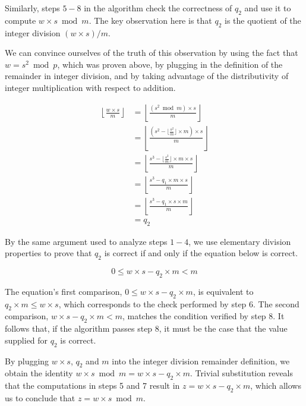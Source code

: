 
Similarly, steps $5 - 8$ in the algorithm check the correctness of $q_2$ and
use it to compute $w \times s \bmod m$. The key observation here is that
$q_2$ is the quotient of the integer division $(w \times s) / m$.

We can convince ourselves of the truth of this observation by using the fact
that $w = s^2 \bmod p$, which was proven above, by plugging in the definition
of the remainder in integer division, and by taking advantage of the
distributivity of integer multiplication with respect to addition.

\begin{align*}
\left\lfloor \frac{w \times s}{m} \right\rfloor
    & = \left\lfloor \frac{(s^2 \bmod m) \times s}{m} \right\rfloor \\
    & = \left\lfloor \frac{(s^2 - \lfloor \frac{s^2}{m} \rfloor \times m)
        \times s}{m} \right\rfloor \\
    & = \left\lfloor \frac{s^3 - \lfloor \frac{s^2}{m} \rfloor \times m
        \times s}{m} \right\rfloor \\
    & = \left\lfloor \frac{s^3 - q_1 \times m \times s}{m} \right\rfloor \\
    & = \left\lfloor \frac{s^3 - q_1 \times s \times m}{m} \right\rfloor \\
    & = q_2
\end{align*}

By the same argument used to analyze steps $1 - 4$, we use elementary division
properties to prove that $q_2$ is correct if and only if the equation below is
correct.

$$ 0 \le w \times s - q_2 \times m < m $$

The equation's first comparison, $0 \le w \times s - q_2 \times m$, is
equivalent to $q_2 \times m \le w \times s$, which corresponds to the check
performed by step 6. The second comparison, $w \times s - q_2 \times m < m$,
matches the condition verified by step 8. It follows that, if the algorithm
passes step 8, it must be the case that the value supplied for $q_2$ is
correct.

By plugging $w \times s$, $q_2$ and $m$ into the integer division remainder
definition, we obtain the identity
$w \times s \bmod m = w \times s - q_2 \times m$. Trivial substitution reveals
that the computations in steps 5 and 7 result in
$z = w \times s - q_2 \times m$, which allows us to conclude that
$z = w \times s \bmod m$.

